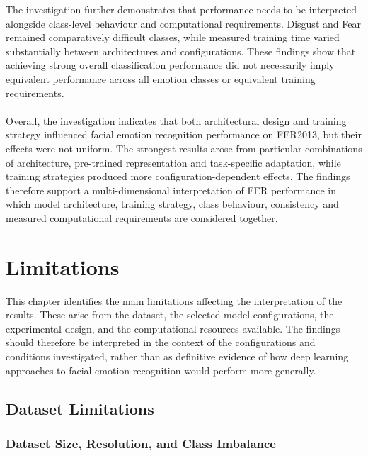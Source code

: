 \documentclass[12pt, a4paper]{report}
\let\oldsection\section
\renewcommand{\section}{%
    \Needspace{6\baselineskip}%
    \oldsection
}
\let\oldsubsection\subsection
\renewcommand{\subsection}{%
    \Needspace{6\baselineskip}%
    \oldsubsection
}
\begin{document}
			The investigation further demonstrates that performance needs to be interpreted alongside class-level behaviour and computational requirements. Disgust and Fear remained comparatively difficult classes, while measured training time varied substantially between architectures and configurations. These findings show that achieving strong overall classification performance did not necessarily imply equivalent performance across all emotion classes or equivalent training requirements.\\\\
			Overall, the investigation indicates that both architectural design and training strategy influenced facial emotion recognition performance on FER2013, but their effects were not uniform. The strongest results arose from particular combinations of architecture, pre-trained representation and task-specific adaptation, while training strategies produced more configuration-dependent effects. The findings therefore support a multi-dimensional interpretation of FER performance in which model architecture, training strategy, class behaviour, consistency and measured computational requirements are considered together.
			
	\chapter{Limitations}
	
		This chapter identifies the main limitations affecting the interpretation of the results. These arise from the dataset, the selected model configurations, the experimental design, and the computational resources available. The findings should therefore be interpreted in the context of the configurations and conditions investigated, rather than as definitive evidence of how deep learning approaches to facial emotion recognition would perform more generally.
	
		\section{Dataset Limitations}
			
			\subsection{Dataset Size, Resolution, and Class Imbalance}
				
\end{document}
